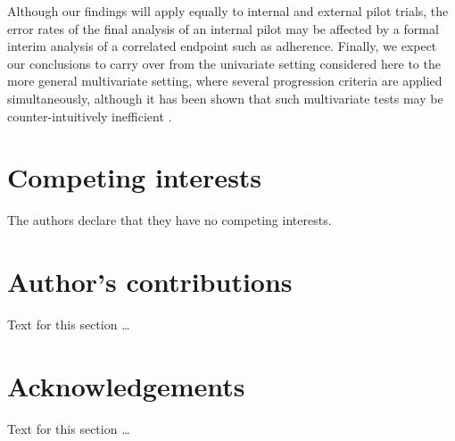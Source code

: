 \documentclass{bmcart}
\begin{document}
Although our findings will apply equally to internal and external pilot trials, the error rates of the final analysis of an internal pilot may be affected by a formal interim analysis of a correlated endpoint such as adherence. Finally, we expect our conclusions to carry over from the univariate setting considered here to the more general multivariate setting, where several progression criteria are applied simultaneously, although it has been shown that such multivariate tests may be counter-intuitively inefficient \cite{Wilson2021a}.


\begin{backmatter}

\section*{Competing interests}
  The authors declare that they have no competing interests.

\section*{Author's contributions}
    Text for this section \ldots

\section*{Acknowledgements}
  Text for this section \ldots
  


\end{backmatter}
\end{document}
